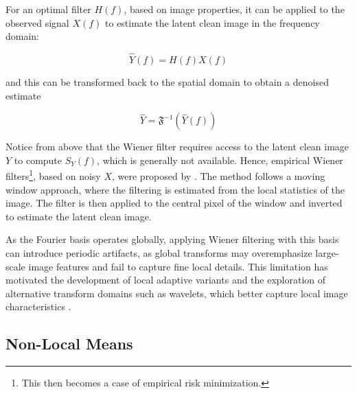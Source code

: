 For an optimal filter $H(f)$, based on image properties, it can be applied to the observed signal $X(f)$ to estimate the latent clean image in the frequency domain:

\begin{equation*}
    \hat{Y}(f) = H(f) X(f)
\end{equation*}

and this can be transformed back to the spatial domain to obtain a denoised estimate

\begin{equation*}
    \hat{Y} = \mathfrak{F}^{-1}(\hat{Y}(f))
\end{equation*}

Notice from above that the Wiener filter requires access to the latent clean image $Y$ to compute $S_Y(f)$, which is generally not available. Hence, empirical Wiener filters\footnote{This then becomes a case of empirical risk minimization.}, based on noisy $X$, were proposed by \citeauthor{yaroslavskyDigitalPictureProcessing1985} \cite{yaroslavskyDigitalPictureProcessing1985}. The method follows a moving window approach, where the filtering is estimated from the local statistics of the image. The filter is then applied to the central pixel of the window and inverted to estimate the latent clean image.

As the Fourier basis operates globally, applying Wiener filtering with this basis can introduce periodic artifacts, as global transforms may overemphasize large-scale image features and fail to capture fine local details. This limitation has motivated the development of local adaptive variants and the exploration of alternative transform domains such as wavelets, which better capture local image characteristics \cite{buadesReviewImageDenoising2005}.

\subsection{Non-Local Means}


